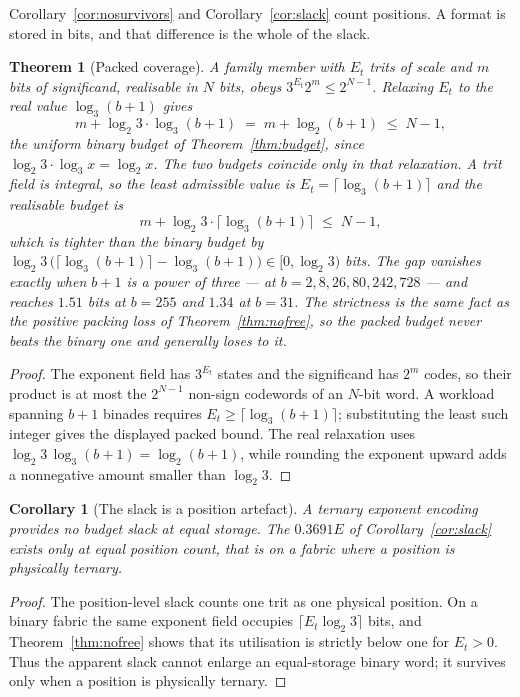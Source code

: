 \documentclass[11pt]{article}
\newtheorem{theorem}{Theorem}
\newtheorem{corollary}{Corollary}
\theoremstyle{definition}
\begin{document}
Corollary~\ref{cor:nosurvivors} and Corollary~\ref{cor:slack} count positions.
A format is stored in bits, and that difference is the whole of the slack.

\begin{theorem}[Packed coverage]
\label{thm:packedcov}
A family member with $E_t$ trits of scale and $m$ bits of significand, realisable
in $N$ bits, obeys $3^{E_t}2^{m} \le 2^{N-1}$. Relaxing $E_t$ to the real value
$\log_3(b+1)$ gives
\[
  m + \log_2 3 \cdot \log_3(b+1) \;=\; m + \log_2(b+1) \;\le\; N-1 ,
\]
the uniform binary budget of Theorem~\ref{thm:budget}, since
$\log_2 3 \cdot \log_3 x = \log_2 x$. The two budgets coincide only in that
relaxation. A trit field is integral, so the least admissible value is
$E_t = \lceil\log_3(b+1)\rceil$ and the realisable budget is
\[
  m + \log_2 3 \cdot \bigl\lceil \log_3(b+1) \bigr\rceil \;\le\; N-1 ,
\]
which is tighter than the binary budget by
$\log_2 3\,\bigl(\lceil\log_3(b+1)\rceil - \log_3(b+1)\bigr) \in [0, \log_2 3)$
bits. The gap vanishes exactly when $b+1$ is a power of three --- at
$b = 2, 8, 26, 80, 242, 728$ --- and reaches $1.51$ bits at $b = 255$ and $1.34$
at $b = 31$. The strictness is the same fact as the positive packing loss of
Theorem~\ref{thm:nofree}, so the packed budget never beats the binary one and
generally loses to it.
\end{theorem}
\begin{proof}
The exponent field has $3^{E_t}$ states and the significand has $2^m$ codes,
so their product is at most the $2^{N-1}$ non-sign codewords of an $N$-bit
word.  A workload spanning $b+1$ binades requires
$E_t\geq\lceil\log_3(b+1)\rceil$; substituting the least such integer gives
the displayed packed bound.  The real relaxation uses
$\log_2 3\,\log_3(b+1)=\log_2(b+1)$, while rounding the exponent upward
adds a nonnegative amount smaller than $\log_2 3$.
\end{proof}

\begin{corollary}[The slack is a position artefact]
\label{cor:slackartefact}
A ternary exponent encoding provides no budget slack at equal storage. The
$0.3691E$ of Corollary~\ref{cor:slack} exists only at equal \emph{position}
count, that is on a fabric where a position is physically ternary.
\end{corollary}
\begin{proof}
The position-level slack counts one trit as one physical position.  On a binary
fabric the same exponent field occupies $\lceil E_t\log_2 3\rceil$ bits, and
Theorem~\ref{thm:nofree} shows that its utilisation is strictly below one for
$E_t>0$.  Thus the apparent slack cannot enlarge an equal-storage binary word;
it survives only when a position is physically ternary.
\end{proof}
\end{document}
